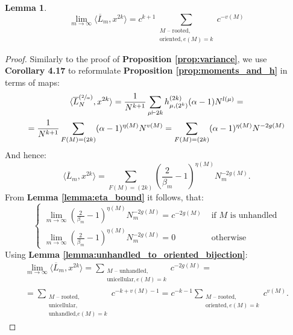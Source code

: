 \documentclass{article}
\newtheorem{lemma}{Lemma}
\begin{document}
\begin{lemma}
\begin{equation}
    \lim\limits_{m \to \infty}\langle \overline{L}_m, x^{2k} \rangle = c^{k + 1}\sum\limits_{\substack{\text{$M$ -- rooted, } \\ \text{oriented}, e(M) = k}}c^{-v(M)}
\end{equation}
\end{lemma}
\begin{proof}
    Similarly to the proof of \textbf{Proposition \ref{prop:variance}}, we use \cite{lacroix} \textbf{Corollary 4.17} to reformulate \textbf{Proposition \ref{prop:moments_and_h}} in terms of maps:
    \begin{multline}        
        \langle \overline{L}_{N}^{(\sfrac{2}{\alpha})}, x^{2k} \rangle = \frac{1}{N^{k + 1}}\sum\limits_{\mu \vdash 2k}h_{\mu, (2^k)}^{(2k)}(\alpha - 1)N^{l(\mu)} = \\
        = \frac{1}{N^{k + 1}}\sum\limits_{\substack{F(M) = (2k)}}(\alpha - 1)^{\eta(M)}N^{v(M)} = \sum\limits_{\substack{F(M) = (2k)}}(\alpha - 1)^{\eta(M)}N^{-2g(M)}
    \end{multline}
    And hence:
    $$ 
        \langle \overline{L}_m, x^{2k} \rangle = \sum\limits_{F(M) = (2k)}\left(\frac{2}{\beta_m} - 1\right)^{\eta(M)}N_m^{-2g(M)}.
    $$
    From \textbf{Lemma \ref{lemma:eta_bound}} it follows, that:
    $$
    \begin{cases}
        \lim\limits_{m \to \infty}\left(\frac{2}{\beta_m} - 1\right)^{\eta(M)}N_m^{-2g(M)} = c^{-2g(M)} & \text{ if $M$ is unhandled} \\
        \lim\limits_{m \to \infty}\left(\frac{2}{\beta_m} - 1\right)^{\eta(M)}N_m^{-2g(M)} = 0 & \text{ otherwise }
    \end{cases}
    $$
    Using \textbf{Lemma \ref{lemma:unhandled_to_oriented_bijection}}:
    \begin{multline*}
        \lim\limits_{m \to \infty}\langle \overline{L}_m, x^{2k} \rangle = \sum\limits_{ \substack{ M  \text{ -- unhandled}, \\ \text{unicellular}, e(M) = k}}c^{-2g(M)} = \\ = \sum\limits_{\substack{\text{$M$ -- rooted, } \\ \text{unicellular,} \\ \text{unhandled,} e(M) = k}}c^{-k + v(M) - 1} = c^{-k - 1}\sum\limits_{\substack{\text{$M$ -- rooted, } \\ \text{oriented}, e(M) = k}}c^{v(M)}.
    \end{multline*}
\end{proof}
\end{document}
